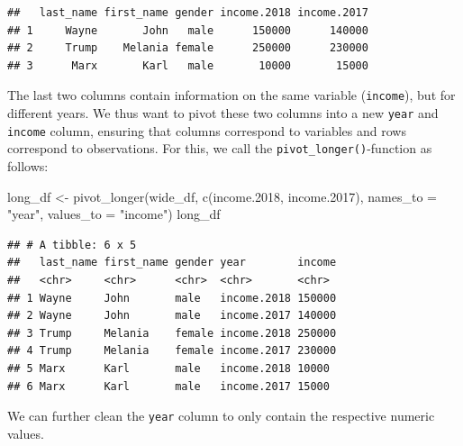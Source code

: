 \documentclass[
  12pt,
]{style/krantz}
\newenvironment{Shaded}{\begin{snugshade}}{\end{snugshade}}
\newcommand{\AttributeTok}[1]{\textcolor[rgb]{0.77,0.63,0.00}{#1}}
\newcommand{\FloatTok}[1]{\textcolor[rgb]{0.00,0.00,0.81}{#1}}
\newcommand{\FunctionTok}[1]{\textcolor[rgb]{0.00,0.00,0.00}{#1}}
\newcommand{\NormalTok}[1]{#1}
\newcommand{\OtherTok}[1]{\textcolor[rgb]{0.56,0.35,0.01}{#1}}
\newcommand{\SpecialCharTok}[1]{\textcolor[rgb]{0.00,0.00,0.00}{#1}}
\newcommand{\StringTok}[1]{\textcolor[rgb]{0.31,0.60,0.02}{#1}}
\begin{document}
\begin{verbatim}
##   last_name first_name gender income.2018 income.2017
## 1     Wayne       John   male      150000      140000
## 2     Trump    Melania female      250000      230000
## 3      Marx       Karl   male       10000       15000
\end{verbatim}

The last two columns contain information on the same variable (\texttt{income}), but for different years. We thus want to pivot these two columns into a new \texttt{year} and \texttt{income} column, ensuring that columns correspond to variables and rows correspond to observations. For this, we call the \texttt{pivot\_longer()}-function as follows:

\begin{Shaded}
\begin{Highlighting}[]
\NormalTok{long\_df }\OtherTok{\textless{}{-}} \FunctionTok{pivot\_longer}\NormalTok{(wide\_df, }\FunctionTok{c}\NormalTok{(income}\FloatTok{.2018}\NormalTok{, income}\FloatTok{.2017}\NormalTok{), }\AttributeTok{names\_to =} \StringTok{"year"}\NormalTok{, }\AttributeTok{values\_to =} \StringTok{"income"}\NormalTok{)}
\NormalTok{long\_df}
\end{Highlighting}
\end{Shaded}

\begin{verbatim}
## # A tibble: 6 x 5
##   last_name first_name gender year        income
##   <chr>     <chr>      <chr>  <chr>       <chr> 
## 1 Wayne     John       male   income.2018 150000
## 2 Wayne     John       male   income.2017 140000
## 3 Trump     Melania    female income.2018 250000
## 4 Trump     Melania    female income.2017 230000
## 5 Marx      Karl       male   income.2018 10000 
## 6 Marx      Karl       male   income.2017 15000
\end{verbatim}

We can further clean the \texttt{year} column to only contain the respective numeric values.

\begin{Shaded}
\end{Shaded}
\end{document}
